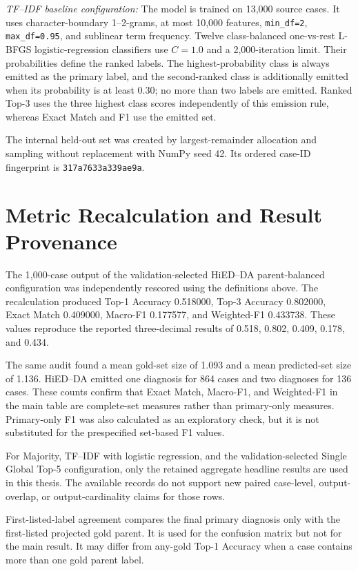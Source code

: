 \documentclass[12pt,a4paper,oneside]{report}
\begin{document}
{\footnotesize
\noindent\textit{TF--IDF baseline configuration:} The model is trained on 13,000 source cases. It uses character-boundary 1--2-grams, at most 10,000 features, \texttt{min\_df=2}, \texttt{max\_df=0.95}, and sublinear term frequency. Twelve class-balanced one-vs-rest L-BFGS logistic-regression classifiers use $C=1.0$ and a 2,000-iteration limit. Their probabilities define the ranked labels. The highest-probability class is always emitted as the primary label, and the second-ranked class is additionally emitted when its probability is at least 0.30; no more than two labels are emitted. Ranked Top-3 uses the three highest class scores independently of this emission rule, whereas Exact Match and F1 use the emitted set.
\par}

The internal held-out set was created by largest-remainder allocation and sampling without replacement with NumPy seed 42. Its ordered case-ID fingerprint is \texttt{317a7633a339ae9a}.

\section{Metric Recalculation and Result Provenance}
\label{sec:metric-audit-boundary}

The 1,000-case output of the validation-selected HiED--DA parent-balanced configuration was independently rescored using the definitions above. The recalculation produced Top-1 Accuracy 0.518000, Top-3 Accuracy 0.802000, Exact Match 0.409000, Macro-F1 0.177577, and Weighted-F1 0.433738. These values reproduce the reported three-decimal results of 0.518, 0.802, 0.409, 0.178, and 0.434.

The same audit found a mean gold-set size of 1.093 and a mean predicted-set size of 1.136. HiED--DA emitted one diagnosis for 864 cases and two diagnoses for 136 cases. These counts confirm that Exact Match, Macro-F1, and Weighted-F1 in the main table are complete-set measures rather than primary-only measures. Primary-only F1 was also calculated as an exploratory check, but it is not substituted for the prespecified set-based F1 values.

For Majority, TF--IDF with logistic regression, and the validation-selected Single Global Top-5 configuration, only the retained aggregate headline results are used in this thesis. The available records do not support new paired case-level, output-overlap, or output-cardinality claims for those rows.

First-listed-label agreement compares the final primary diagnosis only with the first-listed projected gold parent. It is used for the confusion matrix but not for the main result. It may differ from any-gold Top-1 Accuracy when a case contains more than one gold parent label.
\end{document}
